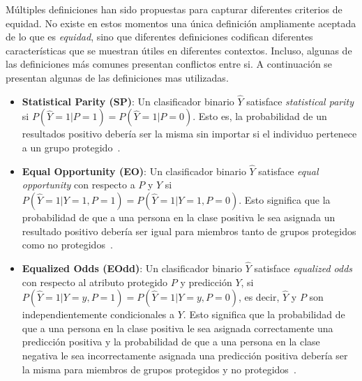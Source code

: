 Múltiples definiciones han sido propuestas para capturar diferentes criterios de equidad.
No existe en estos momentos una única definición ampliamente aceptada de lo que es \textit{equidad}, sino que diferentes definiciones codifican diferentes características que se muestran útiles en diferentes contextos.
Incluso, algunas de las definiciones más comunes presentan conflictos entre si.
A continuación se presentan algunas de las definiciones mas utilizadas. 



 \begin{itemize}
     \item \textbf{Statistical Parity (SP)}: Un clasificador binario $\hat{Y}$ satisface \emph{statistical parity} si $P(\hat{Y}=1|P=1) = P(\hat{Y}=1|P=0)$.
     Esto es, la probabilidad de un resultados positivo debería ser la misma sin importar si el individuo pertenece a un grupo protegido~\parencite{verma2018fairness}.
     \item \textbf{Equal Opportunity (EO)}: Un clasificador binario $\hat{Y}$ satisface \emph{equal opportunity} con respecto a $P$ y $Y$ si $P(\hat{Y}=1|Y=1,P=1) = P(\hat{Y}=1|Y=1,P=0)$.
     Esto significa que la probabilidad de que a una persona en la clase positiva le sea asignada un resultado positivo debería ser igual para miembros tanto de grupos protegidos como no protegidos~\parencite{verma2018fairness}.
     \item \textbf{Equalized Odds (EOdd)}: Un clasificador binario $\hat{Y}$ satisface \emph{equalized odds} con respecto al atributo protegido $P$ y predicción $Y$, si $P(\hat{Y}=1|Y=y,P=1) = P(\hat{Y}=1|Y=y,P=0)$, es decir, $\hat{Y}$ y $P$ son independientemente condicionales a $Y$.
     Esto significa que la probabilidad de que a una persona en la clase positiva le sea asignada correctamente una predicción positiva y la probabilidad de que a una persona en la clase negativa le sea incorrectamente asignada una predicción positiva debería ser la misma para miembros de grupos protegidos y no protegidos~\parencite{verma2018fairness}.
 \end{itemize}

